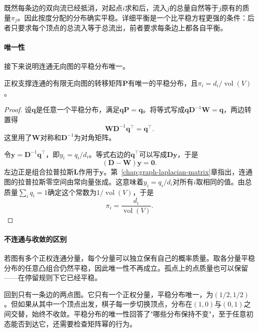 既然每条边的双向流已经抵消，对起点$i$求和后，流入$j$的总量自然等于$j$原有的质量$\pi_j$。因此按度分配的分布确实平稳。详细平衡是一个比平稳方程更强的条件：后者只要求每个顶点的总流入等于总流出，前者要求每条边上都各自平衡。

\paragraph{唯一性}

接下来说明连通无向图的平稳分布唯一。

\begin{theorem}[无向连通图的平稳分布]
\label{thm:graph-walk-stationary-uniqueness}
正权支撑连通的有限无向图的转移矩阵$\bm P$有唯一的平稳分布，且$\pi_i=d_i/\operatorname{vol}(V)$。
\end{theorem}

\begin{proof}
设$\bm{q}$是任意一个平稳分布，满足$\bm{q}\bm{P}=\bm{q}$。将等式写成$\bm{q}\bm{D}^{-1}\bm{W}=\bm{q}$，两边转置得
\[
\bm{W}\bm{D}^{-1}\bm{q}^\top=\bm{q}^\top.
\]
这里用了$\bm{W}$对称和$\bm{D}^{-1}$为对角矩阵。

令$\bm{y}=\bm{D}^{-1}\bm{q}^\top$，即$y_i=q_i/d_i$。等式右边的$\bm{q}^\top$可以写成$\bm{D}\bm{y}$，于是
\[
(\bm{D}-\bm{W})\bm{y}=\bm{0}.
\]
左边正是组合拉普拉斯$\bm{L}$作用于$\bm{y}$。第~\ref{chap:graph-laplacian-matrix}章指出，连通图的拉普拉斯零空间由常向量张成。这意味着$y_i=q_i/d_i$对所有$i$取相同的值。由总质量$\sum_i q_i=1$确定这个常数为$1/\operatorname{vol}(V)$，于是
\begin{equation}
\pi_i=\frac{d_i}{\operatorname{vol}(V)}.
\label{eq:graph-walk-stationary-degrees}
\end{equation}
\end{proof}

\paragraph{不连通与收敛的区别}

若图有多个正权连通分量，每个分量可以独立保有自己的概率质量。取各分量平稳分布的任意凸组合仍然平稳，因此唯一性不再成立。孤点上的点质量也可以保留——在停留规则下它已经平稳。

回到只有一条边的两点图。它只有一个正权分量，平稳分布唯一，为$(1/2,1/2)$。但如果从其中一个顶点出发，棋子每一步切换顶点，分布在$(1,0)$与$(0,1)$之间交替，始终不收敛。平稳分布的唯一性回答了"哪些分布保持不变"，至于任意初态能否到达它，还需要检查矩阵幂的行为。
